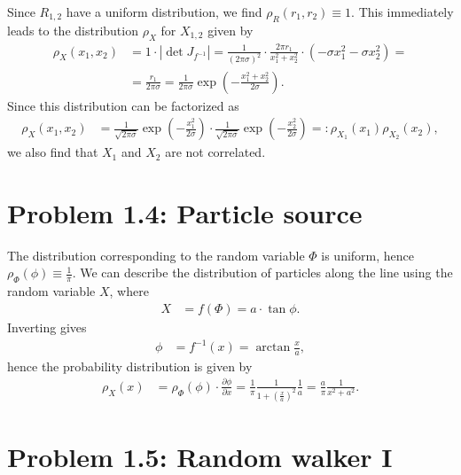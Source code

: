 \documentclass[english, parskip=full]{scrartcl}
\newcommand{\kla}{}
\begin{document}
Since $R_{1,2}$ have a uniform distribution, we find $\rho_R(r_1, r_2)\equiv 1$.
This immediately leads to the distribution $\rho_X$ for $X_{1,2}$ given by
\begin{align}
\rho_X(x_1,x_2)&=1\cdot\left\vert\det J_{f^{-1}}\right\vert=\frac{1}{(2\pi\sigma)^2}\cdot \frac{2\pi r_1}{x_1^2+x_2^2}\cdot\kla\left( -\sigma x_1^2-\sigma x_2^2 \right)=\\
&=\frac{r_1}{2\pi\sigma}=\frac{1}{2\pi\sigma}\exp\kla\left( -\frac{x_1^2+x_2^2}{2\sigma} \right).
\end{align}
Since this distribution can be factorized as
\begin{align}
\rho_X(x_1,x_2)&=\frac{1}{\sqrt{2\pi\sigma}}\exp\kla\left( -\frac{x_1^2}{2\sigma} \right)\cdot\frac{1}{\sqrt{2\pi\sigma}}\exp\kla\left( -\frac{x_2^2}{2\sigma} \right)=:\rho_{X_1}(x_1)\rho_{X_2}(x_2),
\end{align}
we also find that $X_1$ and $X_2$ are not correlated.
\section*{Problem 1.4: Particle source}
The distribution corresponding to the random variable $\Phi$ is uniform, hence $\rho_\Phi(\phi)\equiv \frac{1}{\pi}$.
We can describe the distribution of particles along the line using the random variable $X$, where
\begin{align}
X&=f(\Phi)=a\cdot\tan\phi. 
\end{align}
Inverting gives
\begin{align}
\phi&=f^{-1}(x)=\arctan\frac{x}{a},
\end{align}
hence the probability distribution is given by
\begin{align}
\rho_X(x)&=\rho_\Phi(\phi)\cdot \frac{\partial \phi}{\partial x}=\frac{1}{\pi}\frac{1}{1+\kla\left( \frac{x}{a} \right)^2}\frac{1}{a}=\frac{a}{\pi}\frac{1}{x^2+a^2}.
\end{align}
\section*{Problem 1.5: Random walker I}
\end{document}
